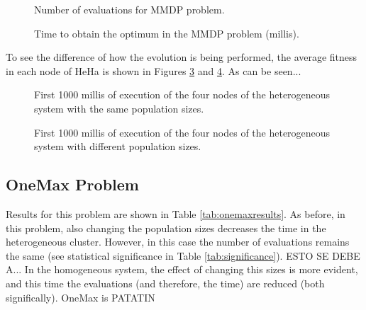 \documentclass{sig-alternate}
\begin{document}



\begin{figure}
\centering
{}
\caption{Number of evaluations for MMDP problem.}
\label{fig:evalsMMDP}
\end{figure}

\begin{figure}
\centering
{}
\caption{Time to obtain the optimum in the MMDP problem (millis).}
\label{fig:timeMMDP}
\end{figure}

To see the difference of how the evolution is being performed, the average fitness in each node of HeHa is shown in Figures \ref{fig:hosiheha} and \ref{fig:hesiheha}. As can be seen...

\begin{figure}
\centering
{}
\caption{First 1000 millis of execution of the four nodes of the heterogeneous system with the same population sizes.}
\label{fig:hosiheha}
\end{figure}

\begin{figure}
\centering
{}
\caption{First 1000 millis of execution of the four nodes of the heterogeneous system with different population sizes.}
\label{fig:hesiheha}
\end{figure}

\subsection{OneMax Problem}

Results for this problem are shown in Table \ref{tab:onemaxresults}. As before, in this problem, also changing the population sizes decreases the time in the heterogeneous cluster. However, in this case the number of evaluations remains the same (see statistical significance in Table \ref{tab:significance}). ESTO SE DEBE A... In the homogeneous system, the effect of changing this sizes is more evident, and this time the evaluations (and therefore, the time) are reduced (both significally). OneMax is PATATIN
\end{document}
